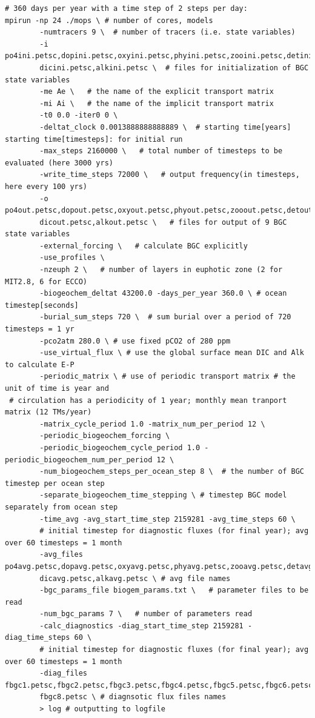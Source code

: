 \documentclass[a4paper]{article}
\begin{document}
\lstset{language=sh} 
\begin{lstlisting}[frame=single,basicstyle=\scriptsize,commentstyle=\color{blue}]
# 360 days per year with a time step of 2 steps per day:
mpirun -np 24 ./mops \ # number of cores, models
        -numtracers 9 \  # number of tracers (i.e. state variables)
        -i po4ini.petsc,dopini.petsc,oxyini.petsc,phyini.petsc,zooini.petsc,detini.petsc,no3ini.petsc,
        dicini.petsc,alkini.petsc \  # files for initialization of BGC state variables
        -me Ae \   # the name of the explicit transport matrix
        -mi Ai \   # the name of the implicit transport matrix
        -t0 0.0 -iter0 0 \
        -deltat_clock 0.0013888888888889 \  # starting time[years] starting time[timesteps]: for initial run
        -max_steps 2160000 \   # total number of timesteps to be evaluated (here 3000 yrs)
        -write_time_steps 72000 \   # output frequency(in timesteps, here every 100 yrs)
        -o po4out.petsc,dopout.petsc,oxyout.petsc,phyout.petsc,zooout.petsc,detout.petsc,no3out.petsc,
        dicout.petsc,alkout.petsc \   # files for output of 9 BGC state variables
        -external_forcing \   # calculate BGC explicitly
        -use_profiles \
        -nzeuph 2 \   # number of layers in euphotic zone (2 for MIT2.8, 6 for ECCO)
        -biogeochem_deltat 43200.0 -days_per_year 360.0 \ # ocean timestep[seconds]
        -burial_sum_steps 720 \  # sum burial over a period of 720 timesteps = 1 yr
        -pco2atm 280.0 \ # use fixed pCO2 of 280 ppm
        -use_virtual_flux \ # use the global surface mean DIC and Alk to calculate E-P
        -periodic_matrix \ # use of periodic transport matrix # the unit of time is year and 
 # circulation has a periodicity of 1 year; monthly mean tranport matrix (12 TMs/year)
        -matrix_cycle_period 1.0 -matrix_num_per_period 12 \
        -periodic_biogeochem_forcing \
        -periodic_biogeochem_cycle_period 1.0 -periodic_biogeochem_num_per_period 12 \
        -num_biogeochem_steps_per_ocean_step 8 \  # the number of BGC timestep per ocean step
        -separate_biogeochem_time_stepping \ # timestep BGC model separately from ocean step
        -time_avg -avg_start_time_step 2159281 -avg_time_steps 60 \
        # initial timestep for diagnostic fluxes (for final year); avg over 60 timesteps = 1 month
        -avg_files po4avg.petsc,dopavg.petsc,oxyavg.petsc,phyavg.petsc,zooavg.petsc,detavg.petsc,no3avg.petsc,
        dicavg.petsc,alkavg.petsc \ # avg file names
        -bgc_params_file biogem_params.txt \   # parameter files to be read
        -num_bgc_params 7 \   # number of parameters read
        -calc_diagnostics -diag_start_time_step 2159281 -diag_time_steps 60 \
        # initial timestep for diagnostic fluxes (for final year); avg over 60 timesteps = 1 month
        -diag_files fbgc1.petsc,fbgc2.petsc,fbgc3.petsc,fbgc4.petsc,fbgc5.petsc,fbgc6.petsc,fbgc7.petsc,
        fbgc8.petsc \ # diagnsotic flux files names
        > log # outputting to logfile

 \end{lstlisting}
\end{document}
